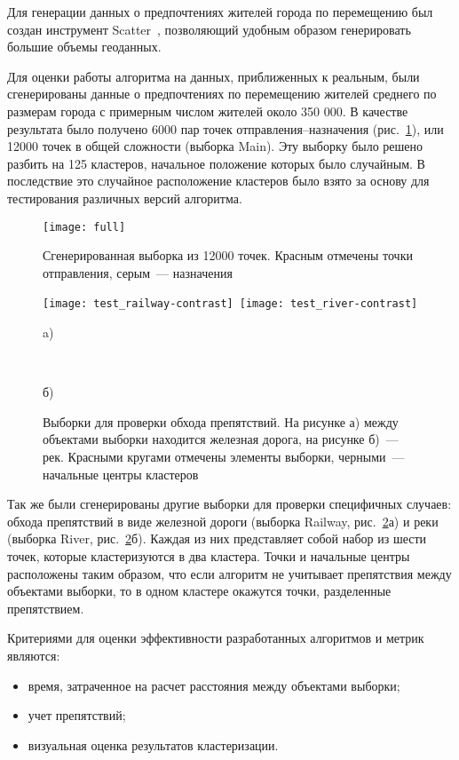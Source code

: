 Для генерации данных о предпочтениях жителей города по перемещению был создан инструмент Scatter~\cite{scatter}, позволяющий удобным образом генерировать большие объемы геоданных.

Для оценки работы алгоритма на данных, приближенных к реальным, были сгенерированы данные о предпочтениях по перемещению жителей среднего по размерам города с примерным числом жителей около 350 000. В качестве результата было получено 6000 пар точек отправления--назначения (рис.~\ref{pic:full}), или 12000 точек в общей сложности (выборка Main). Эту выборку было решено разбить на 125 кластеров, начальное положение которых было случайным. В последствие это случайное расположение кластеров было взято за основу для тестирования различных версий алгоритма.

\begin{figure}[ht!]
    \centering
    \texttt{[image: full]} \\[1ex]
    \parbox{.9\textwidth}{\caption{Сгенерированная выборка из 12000 точек. Красным отмечены точки отправления, серым~--- назначения} \label{pic:full}}
    \vspace*{-1ex}
\end{figure}

\begin{figure}[b!]
    \centering
    \texttt{[image: test\_railway-contrast]}\
    \texttt{[image: test\_river-contrast]} \\
    \parbox{.47\textwidth}{\small\centering a)}\ \parbox{.47\textwidth}{\small\centering б)}
    \parbox{.9\textwidth}{\caption{Выборки для проверки обхода препятствий. На рисунке а) между объектами выборки находится железная дорога, на рисунке б)~--- рек. Красными кругами отмечены элементы выборки, черными~--- начальные центры кластеров} \label{pic:railway-river}}
    \vspace*{-1ex}
\end{figure}

Так же были сгенерированы другие выборки для проверки специфичных случаев: обхода препятствий в виде железной дороги (выборка Railway, рис.~\ref{pic:railway-river}а) и реки (выборка River, рис.~\ref{pic:railway-river}б). Каждая из них представляет собой набор из шести точек, которые кластеризуются в два кластера. Точки и начальные центры расположены таким образом, что если алгоритм не учитывает препятствия между объектами выборки, то в одном кластере окажутся точки, разделенные препятствием.

Критериями для оценки эффективности разработанных алгоритмов и метрик являются:
\begin{itemize}
    \item время, затраченное на расчет расстояния между объектами выборки;
    \item учет препятствий;
    \item визуальная оценка результатов кластеризации.
\end{itemize}
